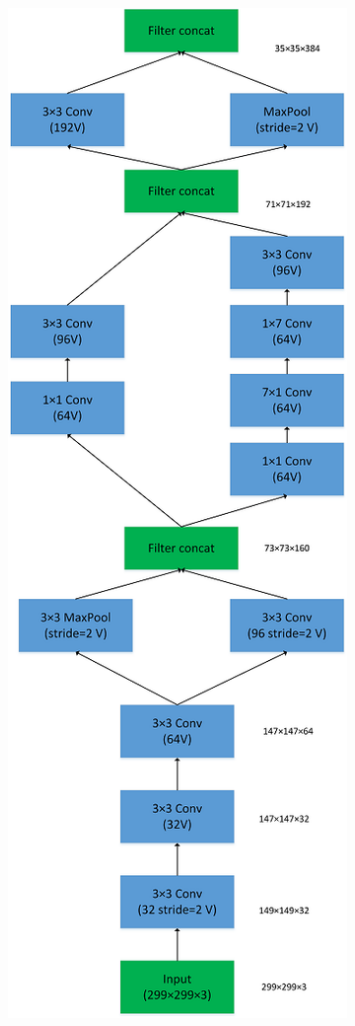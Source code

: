 \begin{figure}
\centering
\includegraphics[width=0.8\textwidth]{./img/ch4/image46.png}
\caption{}
\end{figure}

